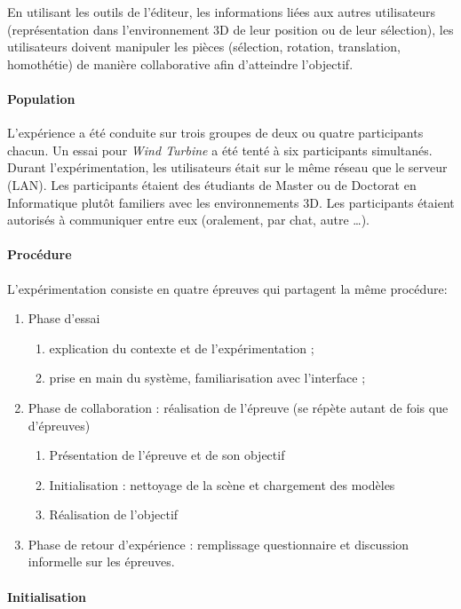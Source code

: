 En utilisant les outils de l'éditeur, les informations liées aux autres utilisateurs 
(représentation dans l'environnement \gls{3D} de leur position ou de leur sélection), 
les 
utilisateurs doivent manipuler les pièces (sélection, rotation, translation, 
homothétie) de manière collaborative afin d'atteindre l'objectif. 
\paragraph{Population}
L'expérience a été conduite sur trois groupes de deux ou quatre participants 
chacun. Un essai pour \textit{Wind Turbine} a été tenté à six participants 
simultanés.
Durant l'expérimentation, les utilisateurs était sur le même réseau que le serveur 
(\gls{LAN}). 
Les participants étaient des étudiants de Master ou de Doctorat en Informatique 
plutôt familiers avec les environnements \gls{3D}. Les participants étaient 
autorisés à 
communiquer entre eux (oralement, par chat, autre \dots).
\paragraph{Procédure}
L'expérimentation consiste en quatre épreuves qui partagent la même procédure:
\begin{enumerate}
	\item Phase d'essai 
	\begin{enumerate}
		\item explication du contexte et de l'expérimentation ;
		\item prise en main du système, familiarisation avec 
		l'interface ;
	\end{enumerate}
	\item Phase de collaboration : réalisation de l'épreuve (se répète autant de fois 
	que d'épreuves)
	\begin{enumerate}
		\item Présentation de l'épreuve et de son objectif
		\item Initialisation : nettoyage de la scène et chargement des modèles
		\item Réalisation de l'objectif
	\end{enumerate}
	\item Phase de retour d'expérience : remplissage questionnaire et discussion 
	informelle sur les épreuves.
\end{enumerate}

\paragraph{Initialisation}

